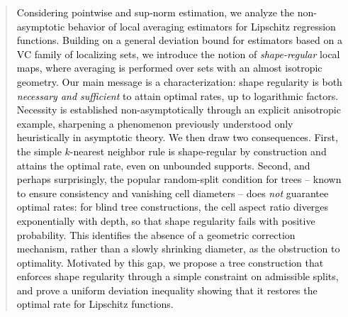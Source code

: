 \documentclass[paper=a4, fontsize=11pt]{scrartcl}
\newcommand{\rev}[1]{\textcolor{black}{#1}}
\begin{document}
\begin{abstract}

\rev{Considering pointwise and sup-norm estimation, we analyze the non-asymptotic behavior of local averaging estimators for Lipschitz regression functions. Building on a general deviation bound for estimators based on a VC family of localizing sets, we introduce the notion of \emph{shape-regular} local maps, where averaging is performed over sets with an almost isotropic geometry. Our main message is a characterization: shape regularity is both \emph{necessary and sufficient} to attain optimal rates, up to logarithmic factors. Necessity is established non-asymptotically through an explicit anisotropic example, sharpening a phenomenon previously understood only heuristically in asymptotic theory. We then draw two consequences. First, the simple $k$-nearest neighbor rule is shape-regular by construction and attains the optimal rate, even on unbounded supports. Second, and perhaps surprisingly, the popular random-split condition for trees -- known to ensure consistency and vanishing cell diameters -- does \emph{not} guarantee optimal rates: for blind tree constructions, the cell aspect ratio diverges exponentially with depth, so that shape regularity fails with positive probability. This identifies the absence of a geometric correction mechanism, rather than a slowly shrinking diameter, as the obstruction to optimality. Motivated by this gap, we propose a tree construction that enforces shape regularity through a simple constraint on admissible splits, and prove a uniform deviation inequality showing that it restores the optimal rate for Lipschitz functions.}


\end{abstract}
\end{document}
